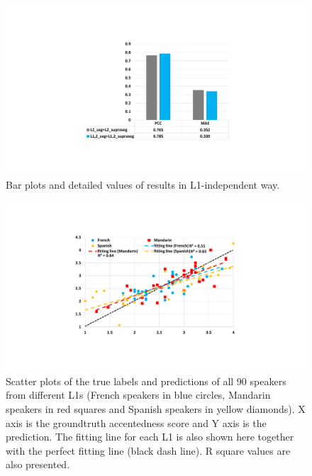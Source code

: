 \begin{figure}[t]
        \begin{minipage}[t]{1.0\linewidth}
        \centering
            \includegraphics[width=5.0in]{figures/allspk_results.pdf}
        \end{minipage}%
        \caption{Bar plots and detailed values of results in L1-independent way.}
        \centering
        \label{fig:allspk_results}
     \end{figure}
     
\begin{figure}[t]
        \begin{minipage}[t]{1.0\linewidth}
        \centering
            \includegraphics[width=5.0in]{figures/allspk_results_scatter.pdf}
        \end{minipage}%
        \caption{Scatter plots of the true labels and predictions of all 90 speakers from different L1s (French speakers in blue circles, Mandarin speakers in red squares and Spanish speakers in yellow diamonds). X axis is the groundtruth accentedness score and Y axis is the prediction. The fitting line for each L1 is also shown here together with the perfect fitting line (black dash line). R square values are also presented.}
        \centering
        \label{fig:allspk_results_scatter}
     \end{figure}

